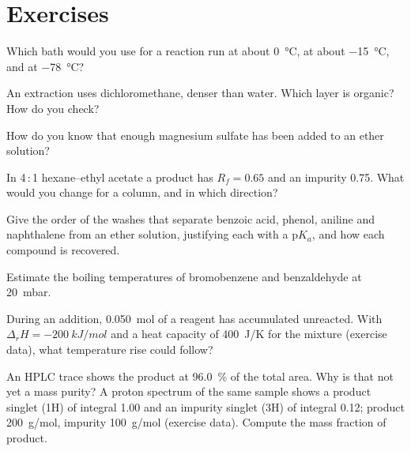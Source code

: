 \section{Exercises}

\begin{exercise}[$\star$]\label{exo:b2:lab-techniques-2:1}
Which bath would you use for a reaction run at about \qty{0}{\degreeCelsius}, at about
\qty{-15}{\degreeCelsius}, and at \qty{-78}{\degreeCelsius}?
\end{exercise}

\begin{exercise}[$\star$]\label{exo:b2:lab-techniques-2:2}
An extraction uses dichloromethane, denser than water. Which layer is organic? How do you check?
\end{exercise}

\begin{exercise}[$\star$]\label{exo:b2:lab-techniques-2:3}
How do you know that enough magnesium sulfate has been added to an ether solution?
\end{exercise}

\begin{exercise}[$\star$]\label{exo:b2:lab-techniques-2:4}
In 4\,:\,1 hexane--ethyl acetate a product has $R_f = 0.65$ and an impurity 0.75. What would you change
for a column, and in which direction?
\end{exercise}

\begin{exercise}[$\star\star$]\label{exo:b2:lab-techniques-2:5}
Give the order of the washes that separate benzoic acid, phenol, aniline and naphthalene from an ether
solution, justifying each with a $\mathrm pK_a$, and how each compound is recovered.
\end{exercise}

\begin{exercise}[$\star\star$]\label{exo:b2:lab-techniques-2:6}
Estimate the boiling temperatures of bromobenzene and benzaldehyde at \qty{20}{mbar}.
\end{exercise}

\begin{exercise}[$\star\star$]\label{exo:b2:lab-techniques-2:7}
During an addition, \qty{0.050}{mol} of a reagent has accumulated unreacted. With $\Delta_rH =
\qty{-200}{kJ/mol}$ and a heat capacity of \qty{400}{J/K} for the mixture (exercise data), what
temperature rise could follow?
\end{exercise}

\begin{exercise}[$\star\star$]\label{exo:b2:lab-techniques-2:8}
An HPLC trace shows the product at 96.0~\% of the total area. Why is that not yet a mass purity? A
proton spectrum of the same sample shows a product singlet (1H) of integral 1.00 and an impurity singlet
(3H) of integral 0.12; product \qty{200}{g/mol}, impurity \qty{100}{g/mol} (exercise data). Compute the
mass fraction of product.
\end{exercise}

